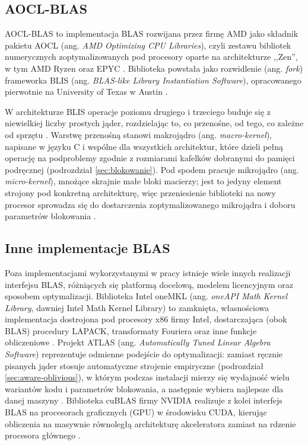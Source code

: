 \documentclass[a4paper,12pt]{book} %
\begin{document}
\subsection{AOCL-BLAS}
\label{sec:blas-aocl}

AOCL-BLAS to implementacja BLAS rozwijana przez firmę AMD jako składnik pakietu AOCL (ang. \emph{AMD Optimizing CPU Libraries}), czyli zestawu bibliotek numerycznych zoptymalizowanych pod procesory oparte na architekturze ,,Zen'', w tym AMD Ryzen oraz EPYC \cite{amd_aocl_blas}. Biblioteka powstała jako rozwidlenie (ang. \emph{fork}) frameworka BLIS (ang. \emph{BLAS-like Library Instantiation Software}), opracowanego pierwotnie na University of Texas w Austin \cite{amd_aocl_blas,vanzee2015blis}.

W architekturze BLIS operacje poziomu drugiego i trzeciego buduje się z niewielkiej liczby prostych jąder, rozdzielając to, co przenośne, od tego, co zależne od sprzętu \cite{vanzee2015blis}. Warstwę przenośną stanowi makrojądro (ang. \emph{macro-kernel}), napisane w języku C i wspólne dla wszystkich architektur, które dzieli pełną operację na podproblemy zgodnie z rozmiarami kafelków dobranymi do pamięci podręcznej (podrozdział \ref{sec:blokowanie}). Pod spodem pracuje mikrojądro (ang. \emph{micro-kernel}), mnożące skrajnie małe bloki macierzy; jest to jedyny element strojony pod konkretną architekturę, więc przeniesienie biblioteki na nowy procesor sprowadza się do dostarczenia zoptymalizowanego mikrojądra i doboru parametrów blokowania \cite{vanzee2015blis}.

\subsection{Inne implementacje BLAS}
\label{sec:blas-inne}

Poza implementacjami wykorzystanymi w pracy istnieje wiele innych realizacji interfejsu BLAS, różniących się platformą docelową, modelem licencyjnym oraz sposobem optymalizacji. Biblioteka Intel oneMKL (ang. \emph{oneAPI Math Kernel Library}, dawniej Intel Math Kernel Library) to zamknięta, własnościowa implementacja dostrojona pod procesory x86 firmy Intel, dostarczająca (obok BLAS) procedury LAPACK, transformaty Fouriera oraz inne funkcje obliczeniowe \cite{intel_onemkl}. Projekt ATLAS (ang. \emph{Automatically Tuned Linear Algebra Software}) reprezentuje odmienne podejście do optymalizacji: zamiast ręcznie pisanych jąder stosuje automatyczne strojenie empiryczne (podrozdział \ref{sec:aware-oblivious}), w którym podczas instalacji mierzy się wydajność wielu wariantów kodu i parametrów blokowania, a następnie wybiera najlepsze dla danej maszyny \cite{whaley2001atlas}. Biblioteka cuBLAS firmy NVIDIA realizuje z kolei interfejs BLAS na procesorach graficznych (GPU) w środowisku CUDA, kierując obliczenia na masywnie równoległą architekturę akceleratora zamiast na rdzenie procesora głównego \cite{nvidia_cublas}.
\end{document}
